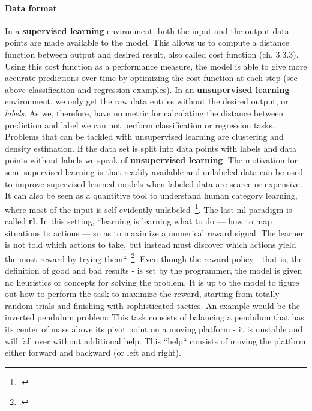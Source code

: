 \paragraph*{Data format}
In a \textbf{supervised learning} environment, both the input and the output data points are made available to the model. This allows us to compute a distance function between output and desired result, also called cost function (ch. 3.3.3). Using this cost function as a performance measure, the model is able to give more accurate predictions over time by optimizing the cost function at each step (see above classification and regression examples). In an \textbf{unsupervised learning} environment, we only get the raw data entries without the desired output, or \textit{labels}. As we, therefore, have no metric for calculating the distance between prediction and label we can not perform classification or regression tasks. Problems that can be tackled with unsupervised learning are clustering and density estimation. If the data set is split into data points with labels and data points without labels we speak of \textbf{unsupervised learning}. The motivation for semi-supervised learning is that readily available and unlabeled data can be used to improve supervised learned models when labeled data are scarce or expensive. It can also be seen as a quantitive tool to understand human category learning, where most of the input is self-evidently unlabeled~\footcite{6813505}. The last \gls{ml} paradigm is called \textbf{\gls{rl}}. In this setting, “learning is learning what to do — how to map situations to actions — so as to maximize a numerical reward signal. The learner is not told which actions to take, but instead must discover which actions yield the most reward by trying them“~\footcite{10.5555/551283}. Even though the reward policy - that is, the definition of good and bad results - is set by the programmer, the model is given no heuristics or concepts for solving the problem. It is up to the model to figure out how to perform the task to maximize the reward, starting from totally random trials and finishing with sophisticated tactics. An example would be the inverted pendulum problem: This task consists of balancing a pendulum that has its center of mass above its pivot point on a moving platform - it is unstable and will fall over without additional help. This “help“ consists of moving the platform either forward and backward (or left and right).

